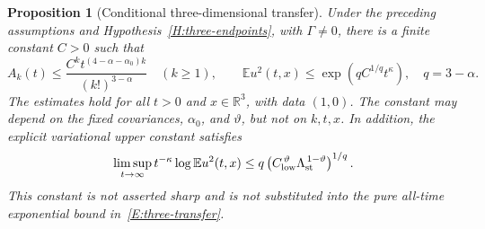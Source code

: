 \documentclass[12pt,oneside,openany]{book}
\numberwithin{equation}{section}
\newtheorem{proposition}[theorem]{Proposition}
\theoremstyle{nogostyle}
\theoremstyle{definition}
\newcommand{\R}{\mathbb{R}}
\newcommand{\E}{\mathbb{E}}
\begin{document}
\begin{proposition}[Conditional three-dimensional transfer]
  \label{P:three-transfer}
  Under the preceding assumptions and Hypothesis~\ref{H:three-endpoints}, with
  $\Gamma \ne 0$, there is a finite constant $C > 0$ such that
  \begin{equation}\label{E:three-transfer}
    A_k(t)\le\frac{C^kt^{(4-\alpha-\alpha_0)k}}{(k!)^{3-\alpha}}
    \quad(k\ge1),\qquad
    \E u^2(t,x)\le\exp\left(qC^{1/q}t^\kappa\right),
    \quad q=3-\alpha.
  \end{equation}
  The estimates hold for all $t > 0$ and $x \in \R^3$, with data $(1,0)$. The
  constant may depend on the fixed covariances, $\alpha_0$, and $\vartheta$, but
  not on $k,t,x$. In addition, the explicit variational upper constant satisfies
  \begin{equation}\label{E:three-variational-upper}
    \limsup_{t\to\infty}t^{-\kappa}\log\E u^2(t,x)
    \le q\left(C_{\rm low}^{\,\vartheta}
    \Lambda_{\rm st}^{\,1-\vartheta}\right)^{1/q}.
  \end{equation}
  This constant is not asserted sharp and is not substituted into the pure
  all-time exponential bound in~\eqref{E:three-transfer}.
\end{proposition}
\end{document}
